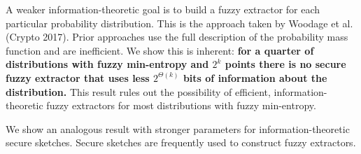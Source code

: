 {A weaker information-theoretic goal is to build a fuzzy extractor for
each particular probability distribution.  This is the approach taken
by Woodage et al. (Crypto 2017).  Prior approaches use the full
description of the probability mass function and are inefficient.  We
show this is inherent: \textbf{for a quarter of distributions with
  fuzzy min-entropy and $2^k$ points there is no secure fuzzy
  extractor that uses less $2^{\Theta(k)}$ bits of information about
  the distribution.}  This result rules out the possibility of
efficient, information-theoretic fuzzy extractors for most
distributions with fuzzy min-entropy.

We show an analogous result with stronger parameters for information-theoretic secure sketches. Secure sketches are frequently used to construct fuzzy extractors. 
}

